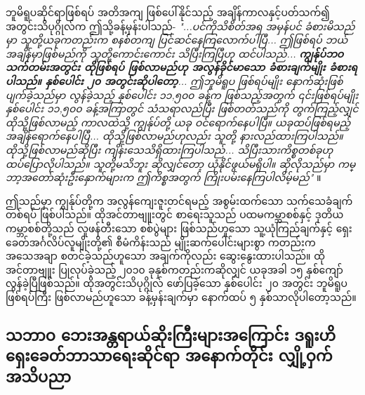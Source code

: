 \documentclass[10pt,twocolumn,letterpaper]{article}
\begin{document}
ဘူမိရူပဆိုင်ရာဖြစ်ရပ် အတိအကျ ဖြစ်ပေါ်နိုင်သည့် အချိန်ကာလနှင့်ပတ်သက်၍ အတွင်းသိပုဂ္ဂိုလ်က ဤသို့ခန့်မှန်းပါသည်- \textit{"...ပင်ကိုသိစိတ်အရ အမှန်ပင် ခံစားမိသည်မှာ သူတို့ယခုကတည်းက စနစ်တကျ ပြင်ဆင်နေကြလောက်ပါပြီ... ဤဖြစ်ရပ် ဘယ်အချိန်မှာဖြစ်မည်ကို သူတို့ကောင်းကောင်း သိပြီးကြပြီဟု ထင်ပါသည်... \textbf{ကျွန်ုပ်ဘဝသက်တမ်းအတွင်း ထိုဖြစ်ရပ် ဖြစ်လာမည်ဟု အလွန်ခိုင်မာသော ခံစားချက်မျိုး ခံစားရပါသည်။ နှစ်ပေါင်း ၂၀ အတွင်းဆိုပါတော့}... ဤဘူမိရူပ ဖြစ်ရပ်မျိုး နောက်ဆုံးဖြစ်ပျက်ခဲ့သည်မှာ လွန်ခဲ့သည့် နှစ်ပေါင်း ၁၁,၅၀၀ ခန့်က ဖြစ်သည့်အတွက် ၎င်းဖြစ်ရပ်မျိုး နှစ်ပေါင်း ၁၁,၅၀၀ ခန့်အကြာတွင် သံသရာလည်ပြီး ဖြစ်တတ်သည်ကို တွက်ကြည့်လျှင် ထိုသို့ဖြစ်လာမည့် ကာလထဲသို့ ကျွန်ုပ်တို့ ယခု ဝင်ရောက်နေပါပြီ။ ယခုထပ်ဖြစ်ရမည့် အချိန်ရောက်နေပါပြီ... ထိုသို့ဖြစ်လာမည်ဟုလည်း သူတို့ နားလည်ထားကြပါသည်။ ထိုသို့ဖြစ်လာမည်ဆိုပြီး ကျိန်းသေသိရှိထားကြပါသည်... သိပြီးသားကိစ္စတစ်ခုဟု ထပ်ပြောလိုပါသည်။ သူတို့မသိဘူး ဆိုလျှင်တော့ ယုံနိုင်ဖွယ်မရှိပါ။ ဆိုလိုသည်မှာ ကမ္ဘာ့အတော်ဆုံးဦးနှောက်များက ဤကိစ္စအတွက် ကြိုးပမ်းနေကြပါလိမ့်မည်"} \cite{4}။

ဤသည်မှာ ကျွန်ုပ်တို့က အလွန်ကျေးဇူးတင်ရမည့် အစွမ်းထက်သော သက်သေခံချက်တစ်ရပ် ဖြစ်ပါသည်။ ထိုအင်တာဗျူးတွင် စာရေးသူသည် ပထမကမ္ဘာစစ်နှင့် ဒုတိယကမ္ဘာစစ်တို့သည် လူဖန်တီးသော စစ်ပွဲများ ဖြစ်သည်ဟူသော သူ့ယုံကြည်ချက်နှင့် ရှေးခေတ်အင်္ဂလိပ်လူမျိုးတို့၏ စီမံကိန်းသည် မျိုးဆက်ပေါင်းများစွာ ကတည်းက အသေအချာ စတင်ခဲ့သည်ဟူသော အချက်ကိုလည်း ဆွေးနွေးထားပါသည်။ ထိုအင်တာဗျူး ပြုလုပ်ခဲ့သည့် ၂၀၁၀ ခုနှစ်ကတည်းကဆိုလျှင် ယခုအခါ ၁၅ နှစ်ကျော်လွန်ခဲ့ပြီဖြစ်သည်။ ထိုအတွင်းသိပုဂ္ဂိုလ် ဖော်ပြခဲ့သော နှစ်ပေါင်း ၂၀ အတွင်း ဘူမိရူပဖြစ်ရပ်ကြီး ဖြစ်လာမည်ဟူသော ခန့်မှန်းချက်မှာ နောက်ထပ် ၅ နှစ်သာလိုပါတော့သည်။
\subsection{သဘာဝ ဘေးအန္တရာယ်ဆိုးကြီးများအကြောင်း  ဒရူးဟိ ရှေးခေတ်ဘာသာရေးဆိုင်ရာ အနောက်တိုင်း လျှို့ဝှက်အသိပညာ}
\end{document}
